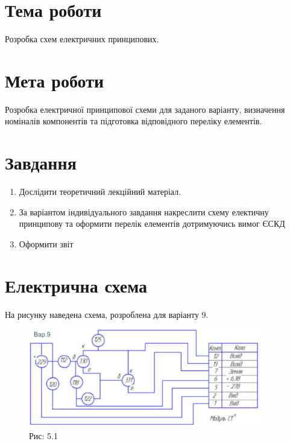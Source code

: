 \documentclass[a4paper]{article}
\begin{document}
\section*{Тема роботи}
Розробка схем
електричних принципових.

\section*{Мета роботи}
Розробка електричної принципової схеми для заданого варіанту, визначення номіналів компонентів та підготовка відповідного переліку елементів.

\section*{Завдання}

\begin{enumerate}
    \item Дослідити теоретичний лекційний матеріал.
    \item За варіантом індивідуального завдання накреслити схему електичну принципову та оформити перелік елементів дотримуючись вимог ЄСКД
    \item Оформити звіт
\end{enumerate}

\section*{Електрична схема}
На рисунку наведена схема, розроблена для варіанту 9.

\begin{figure}[h]
    \centering
    \includegraphics[width=0.9\textwidth]{imgs/PW4.1.png}
    \caption*{Рис: 5.1}
\end{figure}

\newpage
\end{document}
